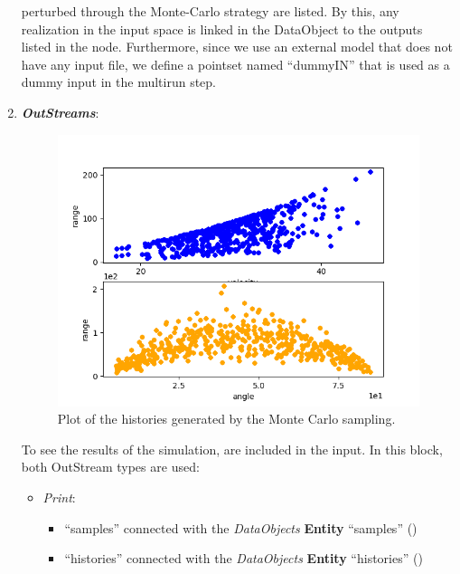 \begin{enumerate}
      perturbed through the Monte-Carlo strategy are listed. By this, any
      realization in the input space is linked in the DataObject to the outputs listed in the
       node. Furthermore, since we use an external model that does not have any input file, we define a pointset named ``dummyIN'' that is used as a dummy input in the multirun step.
   \item \textbf{\textit{OutStreams}}:
 \begin{figure}[h!]
  \centering
  \includegraphics[scale=0.7]{../../tests/framework/user_guide/ForwardSamplingStrategies/gold/RunDir/MonteCarlo/1-historyPlot_scatter-scatter.png}
  \caption{Plot of the histories generated by the Monte Carlo sampling.}
  \label{fig:historiesMCPlotScatter}
 \end{figure}
 To see the results of the simulation,  are included in the input.
  In this block, both OutStream types are used:
  \begin{itemize}
    \item \textit{Print}:
     \begin{itemize}
       \item ``samples'' connected with the \textit{DataObjects} \textbf{Entity} ``samples''
                ()
       \item ``histories'' connected with the \textit{DataObjects} \textbf{Entity} ``histories'' ()

\end{itemize}
\end{itemize}
\end{enumerate}
